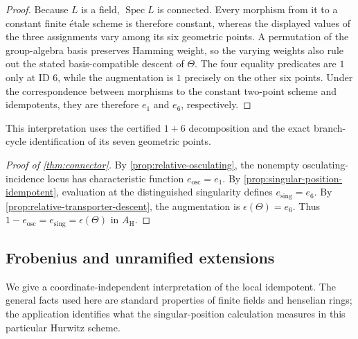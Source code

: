 \documentclass[11pt]{amsart}
\theoremstyle{definition}
\theoremstyle{remark}
\begin{document}
\begin{proof}
Because $L$ is a field, $\operatorname{Spec}L$ is connected.  Every morphism
from it to a constant finite étale scheme is therefore constant, whereas the
displayed values of the three assignments vary among its six geometric
points.  A permutation of the group-algebra basis preserves Hamming weight,
so the varying weights also rule out the stated basis-compatible descent of
$\Theta$.  The four equality predicates are $1$ only at ID $6$, while the
augmentation is $1$ precisely on the other six points.  Under the
correspondence between morphisms to the constant two-point scheme and
idempotents, they are therefore $e_1$ and $e_6$, respectively.
\end{proof}

This interpretation uses the certified $1+6$ decomposition and the exact
branch-cycle identification of its seven geometric points.

\begin{proof}[Proof of \cref{thm:connector}]
By \cref{prop:relative-osculating}, the nonempty osculating-incidence
locus has characteristic function $e_{\mathrm{osc}}=e_1$.
By \cref{prop:singular-position-idempotent}, evaluation at the distinguished
singularity defines $e_{\mathrm{sing}}=e_6$.
By \cref{prop:relative-transporter-descent}, the augmentation is
$\epsilon(\Theta)=e_6$.  Thus
$1-e_{\mathrm{osc}}=e_{\mathrm{sing}}=\epsilon(\Theta)$ in $A_{\mathrm H}$.
\end{proof}

\subsection{Frobenius and unramified extensions}
\label{sec:frobenius-criterion}

We give a coordinate-independent interpretation of the local idempotent.
The general facts used here are standard properties of finite fields and
henselian rings; the application identifies what the singular-position
calculation measures in this particular Hurwitz scheme.
\end{document}
